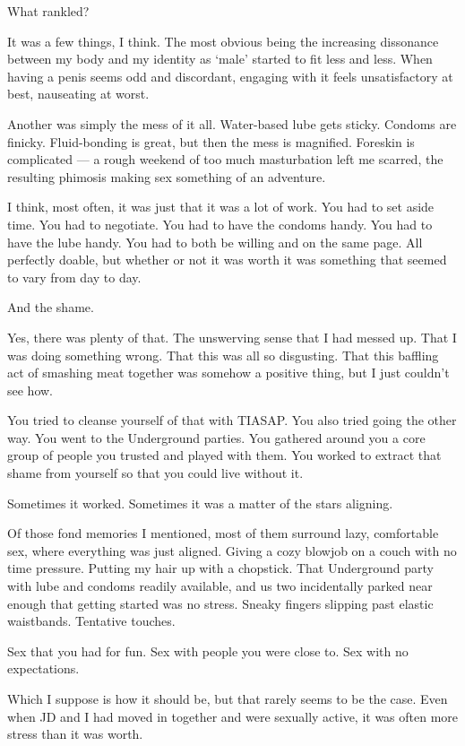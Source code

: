 \begin{paracol}{2}
\begin{leftcolumn}
\begin{ally}
What rankled?
\end{ally}
It was a few things, I think. The most obvious being the increasing dissonance between my body and my identity as `male' started to fit less and less. When having a penis seems odd and discordant, engaging with it feels unsatisfactory at best, nauseating at worst.

Another was simply the mess of it all. Water-based lube gets sticky. Condoms are finicky. Fluid-bonding is great, but then the mess is magnified. Foreskin is complicated --- a rough weekend of too much masturbation left me scarred, the resulting phimosis making sex something of an adventure.

I think, most often, it was just that it was a lot of work. You had to set aside time. You had to negotiate. You had to have the condoms handy. You had to have the lube handy. You had to both be willing and on the same page. All perfectly doable, but whether or not it was worth it was something that seemed to vary from day to day.

\begin{ally}
And the shame.
\end{ally}
Yes, there was plenty of that. The unswerving sense that I had messed up. That I was doing something wrong. That this was all so disgusting. That this baffling act of smashing meat together was somehow a positive thing, but I just couldn't see how.

\begin{ally}
You tried to cleanse yourself of that with TIASAP. You also tried going the other way. You went to the Underground parties. You gathered around you a core group of people you trusted and played with them. You worked to extract that shame from yourself so that you could live without it.
\end{ally}
Sometimes it worked. Sometimes it was a matter of the stars aligning.

Of those fond memories I mentioned, most of them surround lazy, comfortable sex, where everything was just aligned. Giving a cozy blowjob on a couch with no time pressure. Putting my hair up with a chopstick. That Underground party with lube and condoms readily available, and us two incidentally parked near enough that getting started was no stress. Sneaky fingers slipping past elastic waistbands. Tentative touches.

\begin{ally}
Sex that you had for fun. Sex with people you were close to. Sex with no expectations.
\end{ally}
Which I suppose is how it should be, but that rarely seems to be the case. Even when JD and I had moved in together and were sexually active, it was often more stress than it was worth.


\end{leftcolumn}
\end{paracol}
